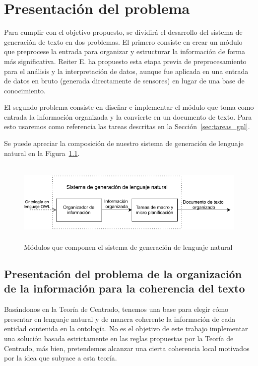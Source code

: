 \chapter{Presentación del problema}

Para cumplir con el objetivo propuesto, se dividirá el desarrollo del sistema de generación de texto en dos problemas. El primero consiste en crear un módulo que preprocese la entrada para organizar y estructurar la información de forma más significativa. Reiter E. ha propuesto esta etapa previa de preprocesamiento~\cite{reiter2007architecture} para el análisis y la interpretación de datos, aunque fue aplicada en una entrada de datos en bruto (generada directamente de sensores) en lugar de una base de conocimiento.

El segundo problema consiste en diseñar e implementar el módulo que toma como entrada la información organizada y la convierte en un documento de texto. Para esto usaremos como referencia las tareas descritas en la Sección~\ref{sec:tareas_gnl}.

Se puede apreciar la composición de nuestro sistema de generación de lenguaje natural en la Figura~\ref{fig:modulos_sgln}.

\begin{figure}
    \centering
    \includegraphics[width=12cm, height=4cm]{img/presentacion_problema/modulos_sgln.pdf}
    \caption{Módulos que componen el sistema de generación de lenguaje natural}
    \label{fig:modulos_sgln}
\end{figure}

\section{Presentación del problema de la organización de la información para la coherencia del texto}
\label{sec:problema_coherencia-texto}

Basándonos en la Teoría de Centrado, tenemos una base para elegir cómo presentar en lenguaje natural y de manera coherente la información de cada entidad contenida en la ontología. No es el objetivo de este trabajo implementar una solución basada estrictamente en las reglas propuestas por la Teoría de Centrado, más bien, pretendemos alcanzar una cierta coherencia local motivados por la idea que subyace a esta teoría.

